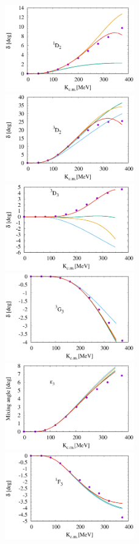 \documentclass{article}
\begin{document}
\begin{figure}[htbp]
\includegraphics[width=0.5\textwidth]{5_1d2.eps}
\includegraphics[width=0.5\textwidth]{5_3d2.eps}
\includegraphics[width=0.5\textwidth]{5_3d3.eps}
\includegraphics[width=0.5\textwidth]{5_3g3.eps}
\includegraphics[width=0.5\textwidth]{5_e3.eps}
\includegraphics[width=0.5\textwidth]{5_1f3.eps}

\end{figure}
\end{document}
